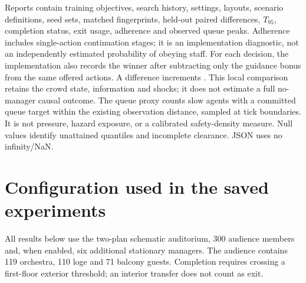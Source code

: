 \documentclass[11pt]{article}
\newcommand{\code}[1]{\texttt{\detokenize{#1}}}
\begin{document}
Reports contain training objectives, search history, settings, layouts, scenario
definitions, seed sets, matched fingerprints, held-out paired differences,
$T_{95}$, completion status, exit usage, adherence and observed queue peaks.
Adherence includes single-action continuation stages; it is an implementation
diagnostic, not an independently estimated probability of obeying staff.
For each decision, the implementation also records the winner after subtracting
only the guidance bonus from the same offered actions. A difference increments
\code{changedChoiceDecisions}. This local comparison retains the crowd state,
information and shocks; it does not estimate a full no-manager causal outcome.
The queue proxy counts slow agents with a committed queue target within the
existing observation distance, sampled at tick boundaries. It is not pressure,
hazard exposure, or a calibrated safety-density measure. Null values identify
unattained quantiles and incomplete clearance. JSON uses no infinity/NaN.

\section{Configuration used in the saved experiments}
All results below use the two-plan schematic auditorium, 300 audience members
and, when enabled, six additional stationary managers. The audience contains
119 orchestra, 110 loge and 71 balcony guests. Completion requires crossing a
first-floor exterior threshold; an interior transfer does not count as exit.
\end{document}
